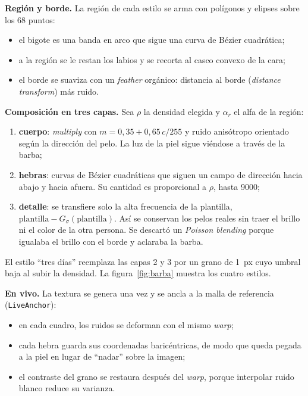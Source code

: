 \textbf{Región y borde.} La región de cada estilo se arma con polígonos y elipses sobre los 68 puntos:
\begin{itemize}
  \item el bigote es una banda en arco que sigue una curva de Bézier cuadrática;
  \item a la región se le restan los labios y se recorta al casco convexo de la cara;
  \item el borde se suaviza con un \emph{feather} orgánico: distancia al borde (\emph{distance transform}) más ruido.
\end{itemize}

\textbf{Composición en tres capas.} Sea $\rho$ la densidad elegida y $\alpha_r$ el alfa de la región:
\begin{enumerate}
  \item \textbf{cuerpo}: \emph{multiply} con $m=0{,}35+0{,}65\,c/255$ y ruido anisótropo orientado según la dirección del pelo. La luz de la piel sigue viéndose a través de la barba;
  \item \textbf{hebras}: curvas de Bézier cuadráticas que siguen un campo de dirección hacia abajo y hacia afuera. Su cantidad es proporcional a $\rho$, hasta 9000;
  \item \textbf{detalle}: se transfiere solo la alta frecuencia de la plantilla, $\text{plantilla}-G_\sigma(\text{plantilla})$. Así se conservan los pelos reales sin traer el brillo ni el color de la otra persona. Se descartó un \emph{Poisson blending} \cite{perez2003} porque igualaba el brillo con el borde y aclaraba la barba.
\end{enumerate}
El estilo ``tres días'' reemplaza las capas 2 y 3 por un grano de 1~px cuyo umbral baja al subir la densidad. La figura~\ref{fig:barba} muestra los cuatro estilos.

\textbf{En vivo.} La textura se genera una vez y se ancla a la malla de referencia (\texttt{LiveAnchor}):
\begin{itemize}
  \item en cada cuadro, los ruidos se deforman con el mismo \emph{warp};
  \item cada hebra guarda sus coordenadas baricéntricas, de modo que queda pegada a la piel en lugar de ``nadar'' sobre la imagen;
  \item el contraste del grano se restaura después del \emph{warp}, porque interpolar ruido blanco reduce su varianza.
\end{itemize}

